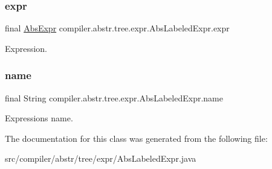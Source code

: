 \subsubsection{\texorpdfstring{expr}{expr}}
{\footnotesize\ttfamily final \hyperlink{classcompiler_1_1abstr_1_1tree_1_1expr_1_1_abs_expr}{Abs\+Expr} compiler.\+abstr.\+tree.\+expr.\+Abs\+Labeled\+Expr.\+expr}

Expression. \mbox{\label{classcompiler_1_1abstr_1_1tree_1_1expr_1_1_abs_labeled_expr_a0020acee7aed5fa9b375a152db90ae62}} 
\subsubsection{\texorpdfstring{name}{name}}
{\footnotesize\ttfamily final String compiler.\+abstr.\+tree.\+expr.\+Abs\+Labeled\+Expr.\+name}

Expression\textquotesingle{}s name. 

The documentation for this class was generated from the following file\+:\begin{DoxyCompactItemize}
\item 
src/compiler/abstr/tree/expr/Abs\+Labeled\+Expr.\+java\end{DoxyCompactItemize}
